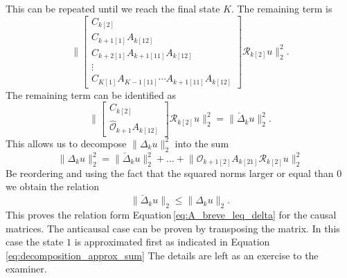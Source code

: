\documentclass[doctype=mastersthesis,BCOR=15mm,biblatex]{ldvbook}%
\newcommand{\R}{\mathcal{R}} %
\newcommand{\Ob}{\mathcal{O}} %
\begin{document}
This can be repeated until we reach the final state $K$.
The remaining term is 
\begin{equation}
	\Bigg\|
	\begin{bmatrix}
	C_{k[2]}\\
	C_{k+1[1]}A_{k[12]}\\
	C_{k+2[1]}A_{k+1[11]}A_{k[12]}\\
	\vdots\\
	C_{K[1]}A_{K-1[11]}\cdots  A_{k+1[11]} A_{k[12]}
	\end{bmatrix}  \R_{k[2]} u
	\Bigg\|_2^2
	.
\end{equation}
The remaining term can be identified as 
\begin{equation}
\Bigg\|
\begin{bmatrix}
C_{k[2]}\\
\hat{\Ob}_{k+1}A_{k[12]}
\end{bmatrix}  \R_{k[2]} u
\Bigg\|_2^2
=
\Big\|\breve{\Delta}_k u\Big\|_2^2
.
\end{equation}
This allows us to decompose $\|\Delta_k u\|_2^2$ into the sum
\begin{equation}
\|\Delta_k u\|_2^2
	  =
	    \|\breve{\Delta}_k u\|_2^2
	  + \dots + \Big\|
	  \Ob_{k+1[2]}A_{k[21]}
	  \R_{k[2]} u
	  \Big\|_2^2
\end{equation}
Be reordering and using the fact that the squared norms larger or equal than $0$ we obtain the relation
\begin{equation}
	\|\breve{\Delta}_k u\|_2 \leq \|\Delta_k u\|_2 
	.
\end{equation}
This proves the relation form Equation\,\ref{eq:A_breve_leq_delta} for the causal matrices.
The anticausal case can be proven by transposing the matrix.
In this case the state $1$ is approximated first as indicated in Equation\,\ref{eq:decomposition_approx_sum}
The details are left as an exercise to the examiner.
\end{document}
